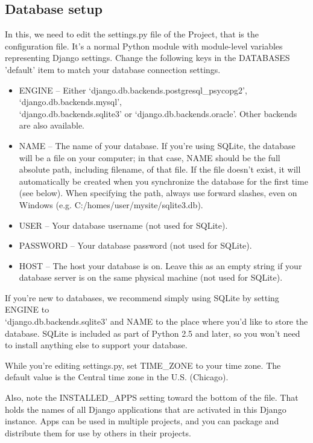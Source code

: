 \subsection{Database setup}
In this, we need to edit the settings.py file of the Project, that is the 
configuration file. It's a normal Python module with module-level 
variables representing Django settings. Change the following keys in 
the DATABASES 'default' item to match your database connection 
settings.
\begin{itemize}
\item ENGINE -- Either `django.db.backends.postgresql\_psycopg2', 
`django.db.backends.mysql',\\ `django.db.backends.sqlite3' or 
`django.db.backends.oracle'. Other backends are also available.
\item NAME -- The name of your database. If you're using SQLite, 
the database will be a file on your computer; in that case, NAME 
should be the full absolute path, including filename, of that file. If 
the file doesn't exist, it will automatically be created when you 
synchronize the database for the first time (see below). When specifying 
the path, always use forward slashes, even on Windows 
(e.g. C:/homes/user/mysite/sqlite3.db). 
\item USER -- Your database username (not used for SQLite).
\item PASSWORD -- Your database password (not used for SQLite).
\item HOST -- The host your database is on. Leave this as an empty 
string if your database server is on the same physical machine (not 
used for SQLite).
\end{itemize}

If you're new to databases, we recommend simply using SQLite by setting 
ENGINE to \\`django.db.backends.sqlite3' and NAME to the place where 
you'd like to store the database. SQLite is included as part of Python 
2.5 and later, so you won't need to install anything else to support 
your database.

While you're editing settings.py, set TIME\_ZONE to your time zone. The 
default value is the Central time zone in the U.S. (Chicago).

Also, note the INSTALLED\_APPS setting toward the bottom of the file. 
That holds the names of all Django applications that are activated in 
this Django instance. Apps can be used in multiple projects, and you 
can package and distribute them for use by others in their projects.


